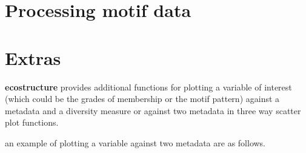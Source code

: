 \documentclass[12pt]{article}
\begin{document}
\newpage

\section{Processing motif data}

\section{Extras}

\textbf{ecostructure} provides additional functions for plotting a variable of interest (which could be the grades of membership or the motif pattern) against a metadata and a diversity measure or against two metadata in three way scatter plot functions.

an example of plotting a variable against two metadata are as follows.
\end{document}
